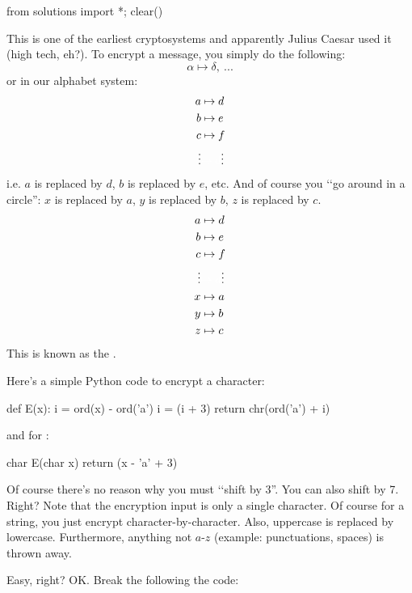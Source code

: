 \begin{python0}
from solutions import *; clear()
\end{python0}

This is one of the earliest cryptosystems and apparently Julius Caesar used it 
(high tech, eh?).
To encrypt a message, you simply do the following:
\[
\alpha \mapsto \delta, \ ...
\]
or in our alphabet system:
\begin{align*}
a &\mapsto d \\
b &\mapsto e \\
c &\mapsto f \\
\vdots &\textwhite{\mapsto d} \vdots 
\end{align*}
i.e. $a$ is replaced by $d$, $b$ is replaced by $e$, etc.
And of course you \lq\lq go around in a circle'': $x$ is replaced by $a$,
$y$ is replaced by $b$, $z$ is replaced by $c$.
\begin{align*}
a &\mapsto d \\
b &\mapsto e \\
c &\mapsto f \\
\vdots &\textwhite{\mapsto d} \vdots \\
x &\mapsto a \\
y &\mapsto b \\
z &\mapsto c
\end{align*}
This is known as the
.

Here's a simple Python code to encrypt a character:
\begin{console}[fontsize=\footnotesize]
def E(x):
    i = ord(x) - ord('a')
    i = (i + 3) %
    return chr(ord('a') + i)
\end{console}
and for \cpp:
\begin{console}[fontsize=\footnotesize]
char E(char x)
{
    return (x - 'a' + 3) %
}
\end{console}

Of course there's no reason why you must \lq\lq shift by 3''.
You can also shift by 7.
Right?
Note that the encryption input is only a single character.
Of course for a string, you just encrypt character-by-character.
Also, uppercase is replaced by lowercase.
Furthermore, 
anything not $a$-$z$ (example: punctuations, spaces) is thrown away.

Easy, right?
OK. Break the following the code:


